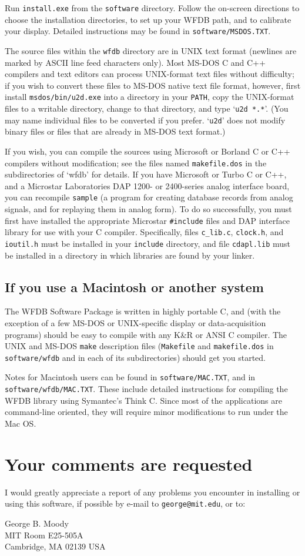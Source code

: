 Run {\tt install.exe} from the {\tt software} directory.  Follow the
on-screen directions to choose the installation directories, to set up
your WFDB path, and to calibrate your display.  Detailed instructions
may be found in {\tt software/MSDOS.TXT}.

The source files within the {\tt wfdb} directory are in UNIX text format
(newlines are marked by ASCII line feed characters only).  Most MS-DOS C and
C++ compilers and text editors can process UNIX-format text files without
difficulty; if you wish to convert these files to MS-DOS native text file
format, however, first install {\tt msdos/bin/u2d.exe} into a directory in your
{\tt PATH}, copy the UNIX-format files to a writable directory, change to that
directory, and type `{\tt u2d *.*}'.   (You may name individual files to be
converted if you prefer. `{\tt u2d}' does not modify binary files or files
that are already in MS-DOS text format.) 
 
If you wish, you can compile the sources using Microsoft or Borland C or C++
compilers without modification; see the files named {\tt makefile.dos} in the
subdirectories of `wfdb' for details.  If you have Microsoft or Turbo C or C++,
and a Microstar Laboratories DAP 1200- or 2400-series analog interface board,
you can recompile {\tt sample} (a program for creating database records from
analog signals, and for replaying them in analog form).  To do so successfully,
you must first have installed the appropriate Microstar {\tt \#include} files
and DAP interface library for use with your C compiler.  Specifically, files
{\tt c\_lib.c}, {\tt clock.h}, and {\tt ioutil.h} must be installed in your
{\tt include} directory, and file {\tt cdapl.lib} must be installed in a
directory in which libraries are found by your linker.

\subsection*{If you use a Macintosh or another system}

The WFDB Software Package is written in highly portable C, and (with
the exception of a few MS-DOS or UNIX-specific display or
data-acquisition programs) should be easy to compile with any K\&R or
ANSI C compiler.  The UNIX and MS-DOS {\tt make} description files
({\tt Makefile} and {\tt makefile.dos} in {\tt software/wfdb} and in
each of its subdirectories) should get you started.

Notes for Macintosh users can be found in {\tt software/MAC.TXT}, and
in {\tt software/wfdb/MAC.TXT}.  These include detailed instructions
for compiling the WFDB library using Symantec's Think C.  Since most
of the applications are command-line oriented, they will require minor
modifications to run under the Mac OS.

\section*{Your comments are requested}

I would greatly appreciate a report of any problems you encounter in installing
or using this software, if possible by e-mail to {\tt george@mit.edu},
or to:
\begin{center}
George B. Moody\\MIT Room E25-505A\\Cambridge, MA 02139 USA
\end{center}

